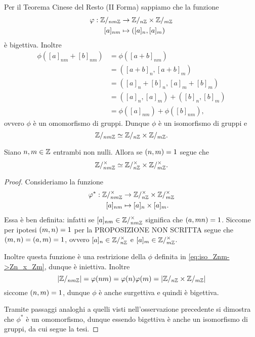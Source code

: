 \begin{remark}
    Per il Teorema Cinese del Resto (II Forma) sappiamo che la funzione 
    \begin{align} \label{eq:iso_Znm->Zn_x_Zm}
        \begin{split}
            \phi : \Zmod{nm} &\to \Zmod n \times \Zmod m\\
            [a]_{nm} &\mapsto ([a]_n, [a]_m)
        \end{split}
    \end{align} è bigettiva. Inoltre \begin{align*}
        \phi([a]_{nm} + [b]_{nm}) &= \phi([a+b]_{nm})\\
        &= ([a+b]_n, [a+b]_m)\\
        &= ([a]_n + [b]_n, [a]_m + [b]_m)\\
        &= ([a]_n, [a]_m) + ([b]_n, [b]_m)\\
        &= \phi([a]_{nm}) + \phi([b]_{nm}),
    \end{align*} ovvero $\phi$ è un omomorfismo di gruppi. Dunque $\phi$ è un isomorfismo di gruppi e \[
        \Zmod{nm} \isomorph \Zmod{n}\times \Zmod{m}.  
    \]
\end{remark}

\begin{corollary}
     Siano $n, m \in \Z$ entrambi non nulli. Allora se $\mcd{n}{m} = 1$ segue che \begin{equation}
        \invert{\Zmod{nm}} \isomorph \invert{\Zmod{n}} \times \invert{\Zmod{m}}.
    \end{equation}
\end{corollary}
\begin{proof}
    Consideriamo la funzione \begin{align*}
        \phi^* : \invert{\Zmod{nm}} &\to \invert{\Zmod{n}} \times \invert{\Zmod{m}}\\
        [a]_{nm} &\mapsto [a]_n \times [a]_m.
    \end{align*}
    Essa è ben definita: infatti se $[a]_{nm} \in \invert{\Zmod{nm}}$ significa che $\mcd{a}{mn} = 1$. Siccome per ipotesi $\mcd{m}{n} = 1$ per la PROPOSIZIONE NON SCRITTA segue che $\mcd{m}{n} = \mcd{a}{m} = 1$, ovvero $[a]_n \in \invert{\Zmod n}$ e $[a]_m \in \invert{\Zmod m}$.

    Inoltre questa funzione è una restrizione della $\phi$ definita in \eqref{eq:iso_Znm->Zn_x_Zm}, dunque è iniettiva. Inoltre \[
        \abs*{\Zmod{nm}} = \phi(nm) = \phi(n)\phi(m) = \abs*{\Zmod{n} \times \Zmod{m}}    
    \] siccome $\mcd{n}{m} = 1$, dunque $\phi$ è anche surgettiva e quindi è bigettiva.

    Tramite passaggi analoghi a quelli visti nell'osservazione precedente si dimostra che $\phi^*$ è un omomorfismo, dunque essendo bigettiva è anche un isomorfismo di gruppi, da cui segue la tesi.
\end{proof}

